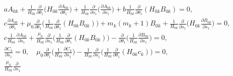 \begin{gather*} 


aA_{0k}+\frac{1}{H_{0k}}\frac{\partial }{\partial \theta_1} 


\bigg(H_{0k}\frac{\partial A_{0k}}{\partial \theta_1} \bigg)+ 


\frac{1}{H_{0k}}\frac{\partial }{\partial s_1} 


\bigg(\frac{\partial A_{0k}}{\partial s_1} \bigg)+b\frac{1}{H_{0k}} 


\frac{\partial }{\partial \theta_1}(H_{0k}B_{0k})=0, \\ 


% 


c\frac{\partial A_{0k}}{\partial \theta_1}+\mu_0 


\frac{\partial }{\partial \theta_1} 


\bigg(\frac{1}{H_{0k}} 


\frac{\partial }{\partial \theta_1}(H_{0k}B_{0k}) \bigg)+m_k(m_k+1) 


B_{0k}+\frac{1}{H_{0k}}\frac{\partial }{\partial s_1} 


\bigg(H_{0k}\frac{\partial B_{0k}}{\partial s_1} \bigg)=0,\\ 


% 


c\frac{1}{H_{0k}}\frac{\partial A_{0k}}{\partial s_1}+ 


\frac{\mu_0}{H_{0k}}\frac{\partial }{\partial s_1} 


\bigg(\frac{1}{H_{0k}}\frac{\partial }{\partial \theta_1} 


(H_{0k}B_{0k})\bigg)-\frac{\partial }{\partial \theta_1} 


\bigg(\frac{1}{H_{0k}}\frac{\partial B_{0k}}{\partial s_1} \bigg)=0,\\ 


% 


\frac{\partial C_k}{\partial s_1}=0,\quad \mu_0 


\frac{\partial }{\partial \theta_1} 


\bigg(\frac{1}{H_{0k}}\frac{\partial C_k}{\partial s_1} \bigg) 


-\frac{1}{H_{0k}}\frac{\partial }{\partial s_1} 


\bigg(\frac{1}{H_{0k}}\frac{\partial }{\partial \theta_1} 


(H_{0k}c_k)\bigg)=0,\\ 


% 


\frac{\mu_0}{H_{0k}}\frac{\partial }{\partial s_1} 



\end{gather*}
